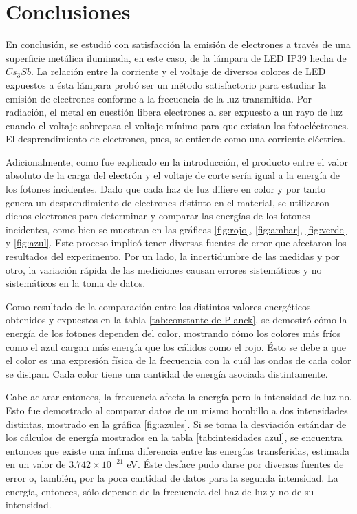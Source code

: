 \documentclass[%
 reprint,
 amsmath,amssymb,
 aps,
]{revtex4-1}
\begin{document}
\section{\label{conclusiones} Conclusiones}

En conclusión, se estudió con satisfacción la emisión de electrones a través de una superficie metálica iluminada, en este caso, de la lámpara de LED IP39 hecha de $Cs_3Sb$. La relación entre la corriente y el voltaje de diversos colores de LED expuestos a ésta lámpara probó ser un método satisfactorio para estudiar la emisión de electrones conforme a la frecuencia de la luz transmitida. Por radiación, el metal en cuestión libera electrones al ser expuesto a un rayo de luz cuando el voltaje sobrepasa el voltaje mínimo para que existan los fotoeléctrones. El desprendimiento de electrones, pues, se entiende como una corriente eléctrica. 

Adicionalmente, como fue explicado en la introducción, el producto entre el valor absoluto de la carga del electrón y el voltaje de corte sería igual a la energía de los fotones incidentes. Dado que cada haz de luz difiere en color y por tanto genera un desprendimiento de electrones distinto en el material, se utilizaron dichos electrones para determinar y comparar las energías de los fotones incidentes, como bien se muestran en las gráficas \ref{fig:rojo}, \ref{fig:ambar}, \ref{fig:verde} y \ref{fig:azul}. Este proceso implicó tener diversas fuentes de error que afectaron los resultados del experimento. Por un lado, la incertidumbre de las medidas y por otro, la variación rápida de las mediciones causan errores sistemáticos y no sistemáticos en la toma de datos.

Como resultado de la comparación entre los distintos valores energéticos obtenidos y expuestos en la tabla \ref{tab:constante de Planck}, se demostró cómo la energía de los fotones dependen del color, mostrando cómo los colores más fríos como el azul cargan más energía que los cálidos como el rojo. Ésto se debe a que el color es una expresión física de la frecuencia con la cuál las ondas de cada color se disipan. Cada color tiene una cantidad de energía asociada distintamente. 

Cabe aclarar entonces, la frecuencia afecta la energía pero la intensidad de luz no. Esto fue demostrado al comparar datos de un mismo bombillo a dos intensidades distintas, mostrado en la gráfica \ref{fig:azules}. Si se toma la desviación estándar de los cálculos de energía mostrados en la tabla \ref{tab:intesidades azul}, se encuentra entonces que existe una ínfima diferencia entre las energías transferidas, estimada en un valor de $3.742 \times 10^{-21}$ eV. Éste desface pudo darse por diversas fuentes de error o, también, por la poca cantidad de datos para la segunda intensidad. La energía, entonces, sólo depende de la frecuencia del haz de luz y no de su intensidad.
\end{document}
